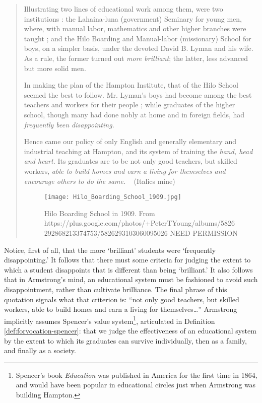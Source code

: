 \begin{quote}

Illustrating two lines of educational work among them, were two institutions : the Lahaina-luna (government) Seminary for young men, where, with manual labor, mathematics and other higher branches were taught ; and the Hilo Boarding and Manual-labor (missionary) School for boys, on a simpler basis, under the devoted David B. Lyman and his wife. As a rule, the former turned out \emph{more brilliant}; the latter, less advanced but more solid men.

In making the plan of the Hampton Institute, that of the Hilo School seemed the best to follow. Mr. Lyman's boys had become among the best teachers and workers for their people ; while graduates of the higher school, though many had done nobly at home and in foreign fields, had \emph{frequently been disappointing.}

Hence came our policy of only English and generally elementary and industrial teaching at Hampton, and its system of training the \emph{hand, head and heart.} Its graduates are to be not only good teachers, but skilled workers, \emph{able to build homes and earn a living for themselves and encourage others to do the same.} ~\citep[p. 2]{Armstrong:1891wr} (Italics mine)\begin{figure*}\texttt{[image: Hilo\_Boarding\_School\_1909.jpg]}\caption{Hilo Boarding School in 1909. From https://plus.google.com/photos/+PeterTYoung/albums/5826292868213374753/5826293103060095026 NEED PERMISSION}\end{figure*}
\end{quote}

Notice, first of all, that the more `brilliant' students were `frequently disappointing.' It follows that there must some criteria for judging the extent to which a student disappoints that is different than being `brilliant.' It also follows that in Armstrong's mind, an educational system must be fashioned to avoid such disappointment, rather than cultivate brilliance. The final phrase of this quotation signals what that criterion is: ``not only good teachers, but skilled workers, able to build homes and earn a living for themselves{\ldots}'' Armstrong implicitly assumes Spencer's value system\footnote{Spencer's book \emph{Education} was published in America for the first time in 1864, and would have been popular in educational circles just when Armstrong was building Hampton.}, articulated in Definition \ref{def:forvocation-spencer}: that we judge the effectiveness of an educational system by the extent to which its graduates can survive individually, then as a family, and finally as a society. 

